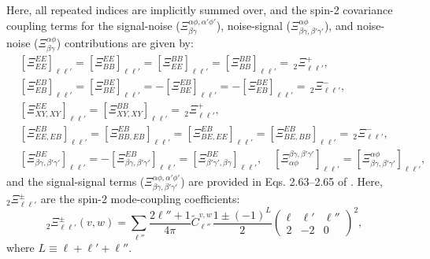 \documentclass[%
 reprint,
superscriptaddress,
nofootinbib,
 amsmath,amssymb,
 aps,
 prd,
]{revtex4-2}
\newcommand{\wtj}[6]{\left(\begin{array}{ccc} #1 & #2 & #3\\#4 & #5 & #6\end{array} \right)}
\begin{document}
  Here, all repeated indices are implicitly summed over, and the spin-2 covariance coupling terms for the signal-noise ($\Xi^{\alpha\phi,\alpha'\phi'}_{\beta\gamma}$), noise-signal ($\Xi^{\alpha\phi}_{\beta\gamma,\beta'\gamma'}$), and noise-noise ($\Xi^{\alpha\phi}_{\beta\gamma}$) contributions are given by:
  \begin{align}
    &\left[\Xi^{EE}_{EE}\right]_{\ell\ell'}=
    \left[\Xi^{EE}_{BB}\right]_{\ell\ell'}=
    \left[\Xi^{BB}_{EE}\right]_{\ell\ell'}=
    \left[\Xi^{BB}_{BB}\right]_{\ell\ell'}=\,_2\Xi_{\ell\ell'}^+,\\
    &\left[\Xi^{EB}_{EB}\right]_{\ell\ell'}=
    \left[\Xi^{BE}_{BE}\right]_{\ell\ell'}=
    -\left[\Xi^{EB}_{BE}\right]_{\ell\ell'}=
    -\left[\Xi^{BE}_{EB}\right]_{\ell\ell'}=\,_2\Xi_{\ell\ell'}^-,\\
    &\left[\Xi^{EE}_{XY,XY}\right]_{\ell\ell'}=\left[\Xi^{BB}_{XY,XY}\right]_{\ell\ell'}=\,_2\Xi^+_{\ell\ell'},\\
    &\left[\Xi^{EB}_{EE,EB}\right]_{\ell\ell'}=\left[\Xi^{EB}_{BB,EB}\right]_{\ell\ell'}=\left[\Xi^{EB}_{BE,EE}\right]_{\ell\ell'}=\left[\Xi^{EB}_{BE,BB}\right]_{\ell\ell'}=\,_2\Xi^-_{\ell\ell'},\\
    &\left[\Xi^{BE}_{\beta\gamma,\beta'\gamma'}\right]_{\ell\ell'}=-\left[\Xi^{EB}_{\beta\gamma,\beta'\gamma'}\right]_{\ell\ell'}=\left[\Xi^{BE}_{\beta'\gamma',\beta\gamma}\right]_{\ell\ell'},\hspace{12pt}\left[\Xi^{\beta\gamma,\beta'\gamma'}_{\alpha\phi}\right]_{\ell\ell'}=\left[\Xi^{\alpha\phi}_{\beta\gamma,\beta'\gamma'}\right]_{\ell\ell'},
  \end{align}
  and the signal-signal terms ($\Xi^{\alpha\phi,\alpha'\phi'}_{\beta\gamma,\beta'\gamma'}$) are provided in Eqs. 2.63--2.65 of \cite{1906.11765}. Here, $_2\Xi^\pm_{\ell\ell'}$ are the spin-2 mode-coupling coefficients:
  \begin{equation}
    _2\Xi^{\pm}_{\ell\ell'}(v,w)=\sum_{\ell''}\frac{2\ell''+1}{4\pi}\tilde{C}^{v,w}_{\ell''}\frac{1\pm(-1)^{L}}{2}\wtj{\ell}{\ell'}{\ell''}{2}{-2}{0}^2,
  \end{equation}
  where $L\equiv\ell+\ell'+\ell''$.
\end{document}
